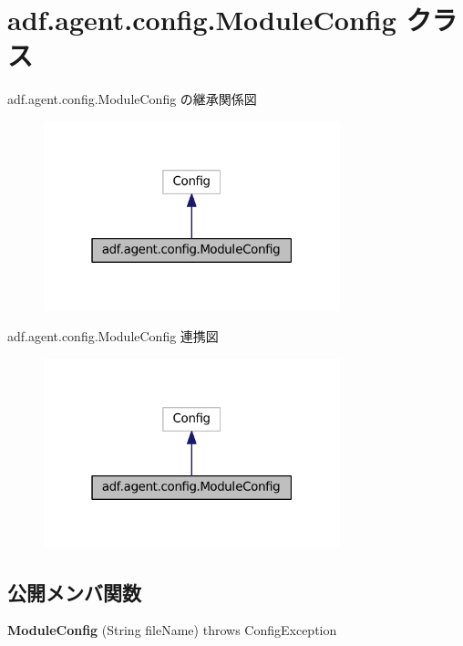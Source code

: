 \hypertarget{classadf_1_1agent_1_1config_1_1ModuleConfig}{}\section{adf.\+agent.\+config.\+Module\+Config クラス}
\label{classadf_1_1agent_1_1config_1_1ModuleConfig}


adf.\+agent.\+config.\+Module\+Config の継承関係図
\nopagebreak
\begin{figure}[H]
\begin{center}
\leavevmode
\includegraphics[width=244pt]{classadf_1_1agent_1_1config_1_1ModuleConfig__inherit__graph}
\end{center}
\end{figure}


adf.\+agent.\+config.\+Module\+Config 連携図
\nopagebreak
\begin{figure}[H]
\begin{center}
\leavevmode
\includegraphics[width=244pt]{classadf_1_1agent_1_1config_1_1ModuleConfig__coll__graph}
\end{center}
\end{figure}
\subsection*{公開メンバ関数}
\begin{DoxyCompactItemize}
\item 
\hypertarget{classadf_1_1agent_1_1config_1_1ModuleConfig_a855a4e62881a6bf754265a148228817f}{}\label{classadf_1_1agent_1_1config_1_1ModuleConfig_a855a4e62881a6bf754265a148228817f} 
{\bfseries Module\+Config} (String file\+Name)  throws Config\+Exception     
\end{DoxyCompactItemize}
